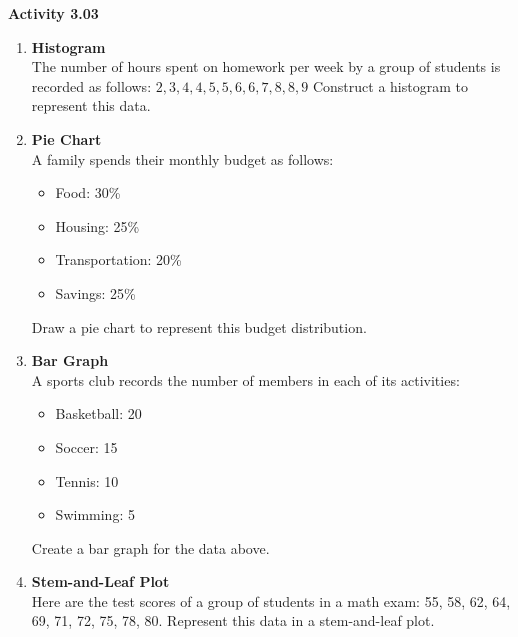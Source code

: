 \vspace{0.3ex}
\noindent\textbf{Activity 3.03}

\vspace{0.2ex}

\begin{enumerate}[label=\color{blue}\arabic*. , noitemsep]
    \item \textbf{Histogram} \\
    The number of hours spent on homework per week by a group of students is recorded as follows:  
    \(
    2, 3, 4, 4, 5, 5, 6, 6, 7, 8, 8, 9
    \)  
    Construct a histogram to represent this data.

    \item \textbf{Pie Chart} \\
    A family spends their monthly budget as follows:
    \begin{itemize}
        \item Food: 30\%
        \item Housing: 25\%
        \item Transportation: 20\%
        \item Savings: 25\%
    \end{itemize}
    Draw a pie chart to represent this budget distribution.

    \item \textbf{Bar Graph} \\
    A sports club records the number of members in each of its activities:
    \begin{itemize}
        \item Basketball: 20
        \item Soccer: 15
        \item Tennis: 10
        \item Swimming: 5
    \end{itemize}
    Create a bar graph for the data above.

    \item \textbf{Stem-and-Leaf Plot} \\
    Here are the test scores of a group of students in a math exam: 55, 58, 62, 64, 69, 71, 72, 75, 78, 80.  
    Represent this data in a stem-and-leaf plot.

\end{enumerate}
